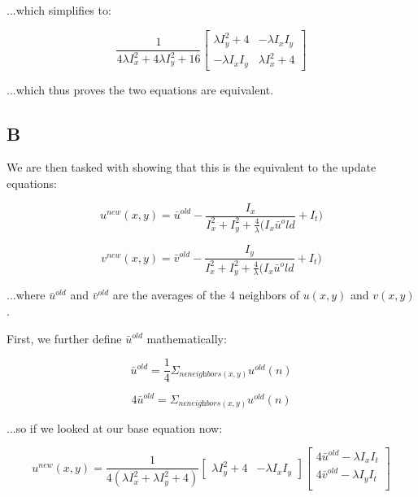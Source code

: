 \documentclass{article}
\begin{document}
\noindent ...which simplifies to:

\begin{equation}
    \frac{1}{4 \lambda I_x^2 + 4\lambda I_y^2 + 16}
    \begin{bmatrix}
        \lambda I_y^2 + 4 & -\lambda I_x I_y \\
        -\lambda I_x I_y & \lambda I_x^2 + 4
    \end{bmatrix}
\end{equation}

\noindent ...which thus proves the two equations are equivalent.

\subsection*{B}

We are then tasked with showing that this is the equivalent to the update equations:

\begin{equation}
    u^{new}(x,y) = \bar{u}^{old}-\frac{I_x}{I_x^2+I_y^2+\frac{4}{\lambda}(I_x\bar{u}^old}+I_t)
\end{equation}

\begin{equation}
    v^{new}(x,y) = \bar{v}^{old}-\frac{I_y}{I_x^2+I_y^2+\frac{4}{\lambda}(I_x\bar{u}^old}+I_t)
\end{equation}

\noindent ...where $\bar{u}^{old}$ and $\bar{v}^{old}$ are the averages of the 4 neighbors of $u(x,y)$ and $v(x,y)$.

\noindent First, we further define $\bar{u}^{old}$ mathematically:

\begin{equation}
    \bar{u}^{old} = \frac{1}{4} \Sigma_{n\epsilon \textit{neighbors}(x,y)} u^{old}(n)
\end{equation}

\begin{equation}
    4\bar{u}^{old} = \Sigma_{n\epsilon \textit{neighbors}(x,y)} u^{old}(n)
\end{equation}

\noindent ...so if we looked at our base equation now:

\begin{equation}
    u^{new}(x,y) =
    \frac{1}{4(\lambda I_x^2 + \lambda I_y^2 + 4)}
    \begin{bmatrix}
        \lambda I_y^2 + 4 & -\lambda I_x I_y
    \end{bmatrix}
    \begin{bmatrix}
        4\bar{u}^{old}-\lambda I_x I_t \\
        4\bar{v}^{old}-\lambda I_y I_t \\
    \end{bmatrix}
\end{equation}
\end{document}
